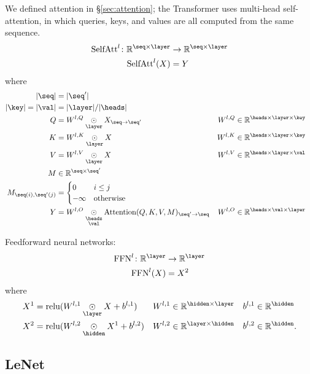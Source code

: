 \documentclass{article}
\newcommand{\reals}{\mathbb{R}}
\begin{document}
We defined attention in \S\ref{sec:attention}; the Transformer uses multi-head self-attention, in which queries, keys, and values are all computed from the same sequence.
\begin{align*}
  \text{SelfAtt}^l \colon \mathbb{R}^{\seq \times \layer} &\rightarrow \mathbb{R}^{\seq \times \layer} \\
  \text{SelfAtt}^l(X) &= Y
\end{align*}
where
\begin{align*}
  |\seq| &= |\seq'| \\
  |\key| = |\val| &= |\layer|/|\heads| \\
  Q &= W^{l,Q} \ndot{\layer} X_{\seq\rightarrow\seq'} & W^{l,Q} &\in \mathbb{R}^{\heads \times \layer \times \key} \\
  K &= W^{l,K} \ndot{\layer} X & W^{l,K} &\in \mathbb{R}^{\heads \times \layer \times \key} \\
  V &= W^{l,V} \ndot{\layer} X & W^{l,V} &\in \mathbb{R}^{\heads \times \layer \times \val} \\
  M & \in \reals^{\seq \times \seq'} \\
  M_{\seq(i), \seq'(j)} &= \begin{cases}
    0 & i \leq j\\
    -\infty & \text{otherwise}
  \end{cases} \\
  Y &= W^{l,O} \ndot{\heads \\ \val} \text{Attention}(Q, K, V, M)_{\seq'\rightarrow\seq} & W^{l,O} &\in \mathbb{R}^{\heads \times \val \times \layer}
\end{align*}

Feedforward neural networks:
\begin{align*}
  \text{FFN}^l \colon \mathbb{R}^{\layer} &\rightarrow \mathbb{R}^{\layer} \\
  \text{FFN}^l(X) &= X^2
\end{align*}
where
\begin{align*}
  X^1 &= \text{relu}(W^{l,1} \ndot{\layer} X + b^{l,1}) & W^{l,1} &\in \mathbb{R}^{\hidden \times \layer} & b^{l,1} &\in \mathbb{R}^{\hidden} \\
  X^2 &= \text{relu}(W^{l,2} \ndot{\hidden} X^1 + b^{l,2}) & W^{l,2} &\in \mathbb{R}^{\layer \times \hidden} & b^{l,2} &\in \mathbb{R}^{\hidden}.
\end{align*}

\subsection{LeNet}
\end{document}
